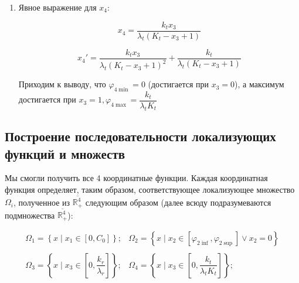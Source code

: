 \documentclass[12pt,a4paper]{article}
\begin{document}
\begin{enumerate}
    \item Явное выражение для $x_4$:

        
        $$ x_4 = \frac{k_{t} x_{3}}{\lambda_{t} \left(K_{t} - x_{3} + 1\right)}$$

        
        $$x_4' = \dfrac{k_{t} x_{3}}{\lambda_{t} \left(K_{t} - x_{3} + 1\right)^{2}} + \dfrac{k_{t}}{\lambda_{t} \left(K_{t} - x_{3} + 1\right)} $$

        
        Приходим к выводу, что \(\varphi_{4 \min} = 0\) (достигается при
    \(x_3 = 0\)), а максимум достигается при $x_3 = 1,\varphi_{4 \max}
    = \dfrac{k_t}{\lambda_t K_t} $

\end{enumerate}

\subsection{Построение последовательности локализующих функций и множеств}

Мы смогли получить все 4 координатные функции. Каждая координатная
функция определяет, таким образом, соответствующее локализующее
множество \(\Omega_i\), полученное из \(\overline{\mathbb{R}_{+}^{4}}\)
следующим образом (далее всюду подразумеваются подмножества
\(\overline{\mathbb{R}_{+}^{4}}\)):

\begin{equation*}    
    \begin{matrix}
    \Omega_1 = \left\{
            x \;|\; x_1 \in \left[ 0, C_0  \right]
                \right\};
    &
    \Omega_2 = \left\{
            x \;|\; x_2 \in \left[ \varphi_{2 \inf}, \varphi_{2 \sup}  \right] \vee x_2 = 0
                \right\}
    \\ \\
    \Omega_3 = \left\{
        x \;|\; x_3 \in \left[ 0, \dfrac{k_r}{\lambda_r}  \right]
            \right\};
    &
    \Omega_4 = \left\{
        x \;|\; x_3 \in \left[ 0, \dfrac{k_t}{\lambda_t K_t} \right]
            \right\};
    \end{matrix}
\end{equation*}
\end{document}
